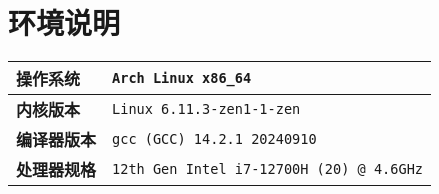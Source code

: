 \section{环境说明}

\begin{table}[h]
    \centering
    \begin{tabular}{|l|l|}
        \hline
        \textbf{操作系统}   & {\tt Arch Linux x86\_64}                     \\ \hline
        \textbf{内核版本}   & {\tt Linux 6.11.3-zen1-1-zen}                \\ \hline
        \textbf{编译器版本} & {\tt gcc (GCC) 14.2.1 20240910}              \\ \hline
        \textbf{处理器规格} & {\tt 12th Gen Intel i7-12700H (20) @ 4.6GHz} \\ \hline
    \end{tabular}
\end{table}